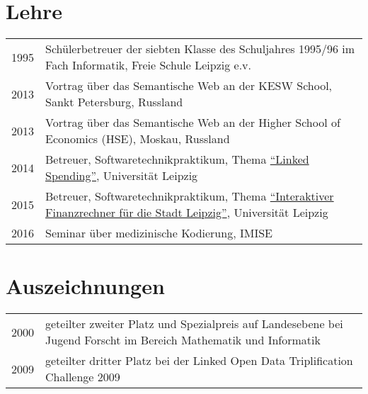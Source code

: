 \documentclass{article}
\begin{document}
\section*{Lehre}
\begin{tabular}{p{3cm}p{10cm}}
1995				&Schülerbetreuer der siebten Klasse des Schuljahres 1995/96 im Fach Informatik, Freie Schule Leipzig e.v.\\
2013				&Vortrag über das Semantische Web an der KESW School, Sankt Petersburg, Russland\\%
2013				&Vortrag über das Semantische Web an der Higher School of Economics (HSE), Moskau, Russland\\%
2014				&Betreuer, Softwaretechnikpraktikum, Thema \href{http://pcai042.informatik.uni-leipzig.de/~staff/SWP-14/index.html}{\enquote{Linked Spending}}, Universität Leipzig\\
2015				&Betreuer, Softwaretechnikpraktikum, Thema \href{http://pcai042.informatik.uni-leipzig.de/~staff/SWP-15/index.html}{\enquote{Interaktiver Finanzrechner für die Stadt Leipzig}}, Universität Leipzig\\
2016				&Seminar über medizinische Kodierung, IMISE\\
\end{tabular}

\section*{Auszeichnungen}
\begin{tabular}{p{3cm}p{10cm}}
2000			&geteilter zweiter Platz und Spezialpreis auf Landesebene bei Jugend Forscht im Bereich Mathematik und Informatik\\
2009			&geteilter dritter Platz bei der Linked Open Data Triplification Challenge 2009\\
\end{tabular}
\end{document}

